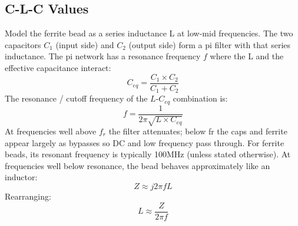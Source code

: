\documentclass[10pt]{article}
\newcommand{\nl}{\newline \newline}
\begin{document}
\subsection{C-L-C Values}\label{sec:clc-values}
Model the ferrite bead as a series inductance L at low-mid frequencies. The two capacitors $C_1$ (input side) and $C_2$ (output side) form a pi filter with that series inductance. The pi network has a resonance frequency $f$ where the L and the effective capacitance interact:
\begin{equation}
    C_{eq} = \frac{C_1 \times C_2}{C_1 + C_2}
\end{equation}
The resonance / cutoff frequency of the $L$-$C_{eq}$ combination is:
\begin{equation}
    f = \frac{1}{2\pi \sqrt{L \times C_{eq}}}
\end{equation}
At frequencies well above $f_r$ the filter attenuates; below fr the caps and ferrite appear largely as bypasses so DC and low frequency pass through.
\nl
For ferrite beads, its resonant frequency is typically 100MHz (unless stated otherwise). At frequencies well below resonance, the bead behaves approximately like an inductor:
\begin{equation}
    Z \approx j2\pi f L
\end{equation}
Rearranging:
\begin{equation}
    L \approx \frac{Z}{2\pi f}
\end{equation}
\end{document}
